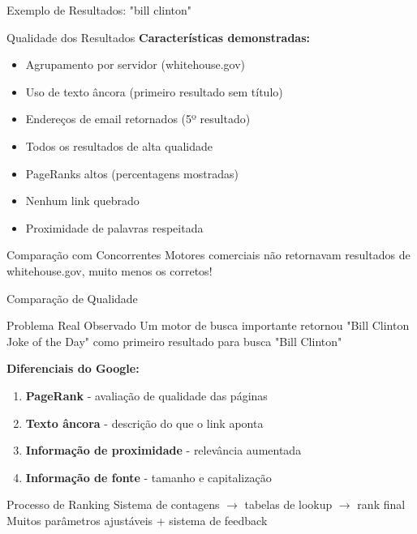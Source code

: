 \documentclass[aspectratio=169]{beamer}
\begin{document}
\begin{frame}{Exemplo de Resultados: "bill clinton"}
\begin{block}{Qualidade dos Resultados}
\textbf{Características demonstradas:}
\begin{itemize}
\item Agrupamento por servidor (whitehouse.gov)
\item Uso de texto âncora (primeiro resultado sem título)
\item Endereços de email retornados (5º resultado)
\item Todos os resultados de alta qualidade
\item PageRanks altos (percentagens mostradas)
\item Nenhum link quebrado
\item Proximidade de palavras respeitada
\end{itemize}
\end{block}

\vspace{0.3cm}
\begin{alertblock}{Comparação com Concorrentes}
Motores comerciais não retornavam resultados de whitehouse.gov, muito menos os corretos!
\end{alertblock}
\end{frame}

\begin{frame}{Comparação de Qualidade}
\begin{exampleblock}{Problema Real Observado}
Um motor de busca importante retornou "Bill Clinton Joke of the Day" como primeiro resultado para busca "Bill Clinton"
\end{exampleblock}

\vspace{0.3cm}
\textbf{Diferenciais do Google:}
\begin{enumerate}
\item \textbf{PageRank} - avaliação de qualidade das páginas
\item \textbf{Texto âncora} - descrição do que o link aponta
\item \textbf{Informação de proximidade} - relevância aumentada
\item \textbf{Informação de fonte} - tamanho e capitalização
\end{enumerate}

\vspace{0.3cm}
\begin{block}{Processo de Ranking}
Sistema de contagens $\rightarrow$ tabelas de lookup $\rightarrow$ rank final\\
Muitos parâmetros ajustáveis + sistema de feedback
\end{block}
\end{frame}
\end{document}
